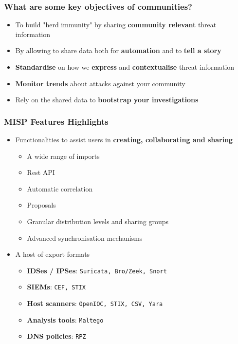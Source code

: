 \begin{frame}
\frametitle{What are some key objectives of communities?}
\begin{itemize}
       \item To build "herd immunity" by sharing {\bf community relevant} threat information
       \item By allowing to share data both for {\bf automation} and to {\bf tell a story}
       \item {\bf Standardise} on how we {\bf express} and {\bf contextualise} threat information
       \item {\bf Monitor trends} about attacks against your community
       \item Rely on the shared data to {\bf bootstrap your investigations}
\end{itemize}
\end{frame}

\begin{frame}
\frametitle{MISP Features Highlights}
    \begin{itemize}
        \item Functionalities to assist users in {\bf creating, collaborating and sharing}
        \begin{itemize}
            \item A wide range of imports
            \item Rest API
            \item Automatic correlation
            \item Proposals
            \item Granular distribution levels and sharing groups
            \item Advanced synchronisation mechanisms
        \end{itemize}
        \item A host of export formats
        \begin{itemize}
            \item {\bf IDSes / IPSes}: \texttt{Suricata, Bro/Zeek, Snort}
            \item {\bf SIEMs}: \texttt{CEF, STIX} 
            \item {\bf Host scanners}:  \texttt{OpenIOC, STIX, CSV, Yara}
            \item {\bf Analysis tools}: \texttt{Maltego}
            \item {\bf DNS policies}: \texttt{RPZ}
        \end{itemize}
    \end{itemize}
\end{frame}

